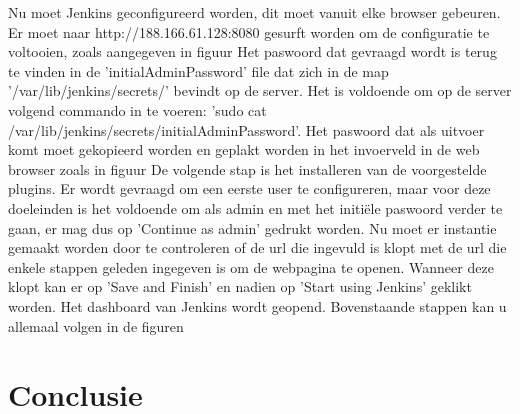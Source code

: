     Nu moet Jenkins geconfigureerd worden, dit moet vanuit elke browser gebeuren.
    Er moet naar http://188.166.61.128:8080 gesurft worden om de configuratie te voltooien, zoals aangegeven in figuur %
    Het paswoord dat gevraagd wordt is terug te vinden in de 'initialAdminPassword' file dat zich in de map '/var/lib/jenkins/secrets/' bevindt op de server. Het is voldoende om op de server volgend commando in te voeren: 'sudo cat /var/lib/jenkins/secrets/initialAdminPassword'. Het paswoord dat als uitvoer komt moet gekopieerd worden en geplakt worden in het invoerveld in de web browser zoals in figuur %
    De volgende stap is het installeren van de voorgestelde plugins. Er wordt gevraagd om een eerste user te configureren, maar voor deze doeleinden is het voldoende om als admin en met het initiële paswoord verder te gaan, er mag dus op 'Continue as admin' gedrukt worden. Nu moet er instantie gemaakt worden door te controleren of de url die ingevuld is klopt met de url die enkele stappen geleden ingegeven is om de webpagina te openen. Wanneer deze klopt kan er op 'Save and Finish' en nadien op 'Start using Jenkins' geklikt worden. Het dashboard van Jenkins wordt geopend. Bovenstaande stappen kan u allemaal volgen in de figuren %
    
\section{Conclusie}
\label{sec:conclusie}

